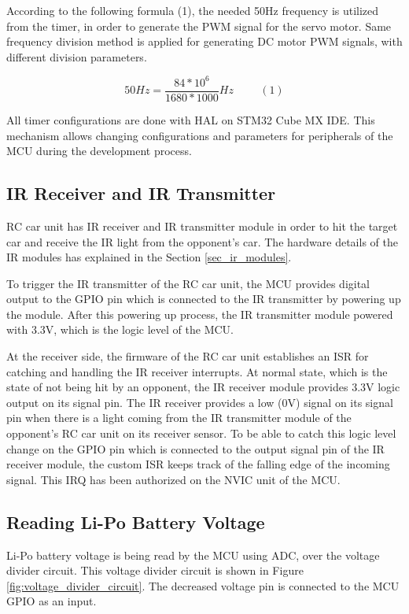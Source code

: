 According to the following formula (1), the needed 50Hz frequency is utilized from the timer, in order to generate the PWM signal for the servo motor. Same frequency division method is applied for generating DC motor PWM signals, with different division parameters.

\[50Hz = \frac{84*10^6}{1680*1000} Hz \hspace{1cm}(1)\]

All timer configurations are done with HAL on STM32 Cube MX IDE. This mechanism allows changing configurations and parameters for peripherals of the MCU during the development process.


\subsection{IR Receiver and IR Transmitter} \label{sec_ir_rx_tx}

RC car unit has IR receiver and IR transmitter module in order to hit the target car and receive the IR light from the opponent's car. The hardware details of the IR modules has explained in the Section \ref{sec_ir_modules}. 

To trigger the IR transmitter of the RC car unit, the MCU provides digital output to the GPIO pin which is connected to the IR transmitter by powering up the module. After this powering up process, the IR transmitter module powered with 3.3V, which is the logic level of the MCU.

At the receiver side, the firmware of the RC car unit establishes an ISR for catching and handling the IR receiver interrupts. At normal state, which is the state of not being hit by an opponent, the IR receiver module provides 3.3V logic output on its signal pin. The IR receiver provides a low (0V) signal on its signal pin when there is a light coming from the IR transmitter module of the opponent’s RC car unit on its receiver sensor. To be able to catch this logic level change on the GPIO pin which is connected to the output signal pin of the IR receiver module, the custom ISR keeps track of the falling edge of the incoming signal. This IRQ has been authorized on the NVIC unit of the MCU.

\subsection{Reading Li-Po Battery Voltage} \label{sec_read_lipo_voltage}

Li-Po battery voltage is being read by the MCU using ADC, over the voltage divider circuit. This voltage divider circuit is shown in Figure \ref{fig:voltage_divider_circuit}. The decreased voltage pin is connected to the MCU GPIO as an input.


